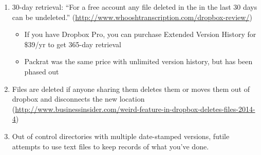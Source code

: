 \documentclass[12pt]{article}
\begin{document}
\begin{enumerate}
\begin{itemize}
		\end{itemize}
	\item 30-day retrieval: ``For a free account any file deleted in the in the last 30 days can be undeleted.'' (\url{http://www.whooshtranscription.com/dropbox-review/})
		\begin{itemize}
			\item If you have Dropbox Pro, you can purchase Extended Version History for $\$$39/yr to get 365-day retrieval
			\item Packrat was the same price with unlimited version history, but has been phased out
		\end{itemize}
	\item Files are deleted if anyone sharing them deletes them or moves them out of dropbox and disconnects the new location \\
	(\url{http://www.businessinsider.com/weird-feature-in-dropbox-deletes-files-2014-4})	
	\item Out of control directories with multiple date-stamped versions, futile attempts to use text files to keep records of what you've
done.
\end{enumerate}
\end{document}
